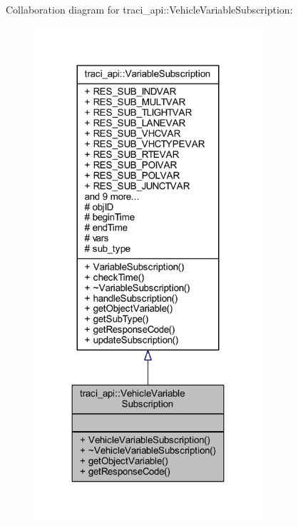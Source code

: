 Collaboration diagram for traci\+\_\+api\+:\+:Vehicle\+Variable\+Subscription\+:
\nopagebreak
\begin{figure}[H]
\begin{center}
\leavevmode
\includegraphics[width=239pt]{classtraci__api_1_1_vehicle_variable_subscription__coll__graph}
\end{center}
\end{figure}
